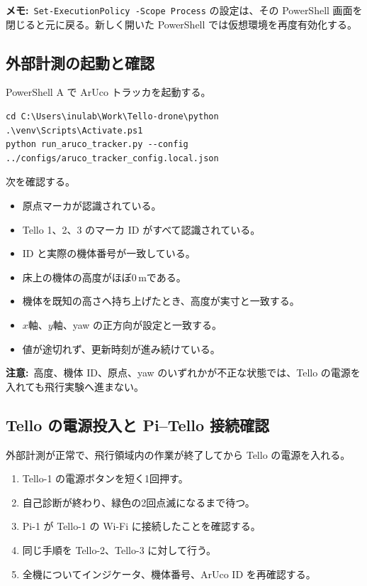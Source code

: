 \documentclass[11pt,a4paper]{ltjsarticle}
\newcommand{\code}[1]{\texttt{\small #1}}
\newcommand{\note}[1]{\par\smallskip\noindent\textbf{メモ:}~#1\par\smallskip}
\newcommand{\warning}[1]{\par\smallskip\noindent\textbf{注意:}~#1\par\smallskip}
\begin{document}
\note{\code{Set-ExecutionPolicy -Scope Process} の設定は、その PowerShell 画面を閉じると元に戻る。新しく開いた PowerShell では仮想環境を再度有効化する。}

\subsection{外部計測の起動と確認}

PowerShell A で ArUco トラッカを起動する。

\begin{lstlisting}
cd C:\Users\inulab\Work\Tello-drone\python
.\venv\Scripts\Activate.ps1
python run_aruco_tracker.py --config ../configs/aruco_tracker_config.local.json
\end{lstlisting}

次を確認する。

\begin{itemize}[leftmargin=1.4em]
  \item 原点マーカが認識されている。
  \item Tello 1、2、3 のマーカ ID がすべて認識されている。
  \item ID と実際の機体番号が一致している。
  \item 床上の機体の高度がほぼ0\,mである。
  \item 機体を既知の高さへ持ち上げたとき、高度が実寸と一致する。
  \item $x$軸、$y$軸、yaw の正方向が設定と一致する。
  \item 値が途切れず、更新時刻が進み続けている。
\end{itemize}

\warning{高度、機体 ID、原点、yaw のいずれかが不正な状態では、Tello の電源を入れても飛行実験へ進まない。}

\subsection{Tello の電源投入と Pi--Tello 接続確認}

外部計測が正常で、飛行領域内の作業が終了してから Tello の電源を入れる。

\begin{enumerate}[leftmargin=1.6em]
  \item Tello-1 の電源ボタンを短く1回押す。
  \item 自己診断が終わり、緑色の2回点滅になるまで待つ。
  \item Pi-1 が Tello-1 の Wi-Fi に接続したことを確認する。
  \item 同じ手順を Tello-2、Tello-3 に対して行う。
  \item 全機についてインジケータ、機体番号、ArUco ID を再確認する。
\end{enumerate}
\end{document}
